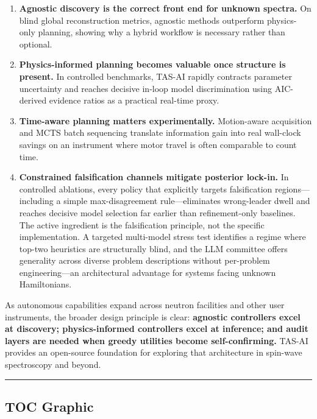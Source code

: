 \documentclass[
]{article}
\providecommand{\tightlist}{%
  \setlength{\itemsep}{0pt}\setlength{\parskip}{0pt}}
\begin{document}
\begin{enumerate}
\def\labelenumi{\arabic{enumi}.}
\tightlist
\item
  \textbf{Agnostic discovery is the correct front end for unknown
  spectra.} On blind global reconstruction metrics, agnostic methods
  outperform physics-only planning, showing why a hybrid workflow is
  necessary rather than optional.
\item
  \textbf{Physics-informed planning becomes valuable once structure is
  present.} In controlled benchmarks, TAS-AI rapidly contracts parameter
  uncertainty and reaches decisive in-loop model discrimination using
  AIC-derived evidence ratios as a practical real-time proxy.
\item
  \textbf{Time-aware planning matters experimentally.} Motion-aware
  acquisition and MCTS batch sequencing translate information gain into
  real wall-clock savings on an instrument where motor travel is often
  comparable to count time.
\item
  \textbf{Constrained falsification channels mitigate posterior
  lock-in.} In controlled ablations, every policy that explicitly
  targets falsification regions---including a simple max-disagreement
  rule---eliminates wrong-leader dwell and reaches decisive model
  selection far earlier than refinement-only baselines. The active
  ingredient is the falsification principle, not the specific
  implementation. A targeted multi-model stress test identifies a regime
  where top-two heuristics are structurally blind, and the LLM committee
  offers generality across diverse problem descriptions without
  per-problem engineering---an architectural advantage for systems
  facing unknown Hamiltonians.
\end{enumerate}

As autonomous capabilities expand across neutron facilities and other
user instruments, the broader design principle is clear:
\textbf{agnostic controllers excel at discovery; physics-informed
controllers excel at inference; and audit layers are needed when greedy
utilities become self-confirming.} TAS-AI provides an open-source
foundation for exploring that architecture in spin-wave spectroscopy and
beyond.

\begin{center}\rule{0.5\linewidth}{0.5pt}\end{center}

\hypertarget{toc-graphic}{%
\subsection{TOC Graphic}\label{toc-graphic}}
\end{document}
